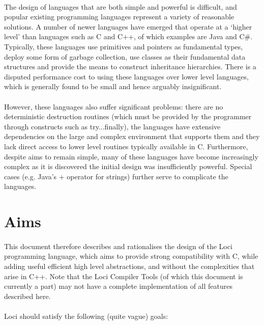 \documentclass[12pt,twoside,notitlepage]{report}
\begin{document}
\paragraph{}
The design of languages that are both simple and powerful is difficult, and popular existing programming languages represent a variety of reasonable solutions. A number of newer languages have emerged that operate at a `higher level' than languages such as C and C++, of which examples are Java and C\#. Typically, these languages use primitives and pointers as fundamental types, deploy some form of garbage collection, use classes as their fundamental data structures and provide the means to construct inheritance hierarchies. There is a disputed performance cost to using these languages over lower level languages, which is generally found to be small and hence arguably insignificant.

\paragraph{}
However, these languages also suffer significant problems: there are no deterministic destruction routines (which must be provided by the programmer through constructs such as try...finally), the languages have extensive dependencies on the large and complex environment that supports them and they lack direct access to lower level routines typically available in C. Furthermore, despite aims to remain simple, many of these languages have become increasingly complex as it is discovered the initial design was insufficiently powerful. Special cases (e.g. Java's + operator for strings) further serve to complicate the languages.

\section{Aims}

\paragraph{}
This document therefore describes and rationalises the design of the Loci programming language, which aims to provide strong compatibility with C, while adding useful efficient high level abstractions, and without the complexities that arise in C++. Note that the Loci Compiler Tools (of which this document is currently a part) may not have a complete implementation of all features described here.

\paragraph{}
Loci should satisfy the following (quite vague) goals:
\end{document}
